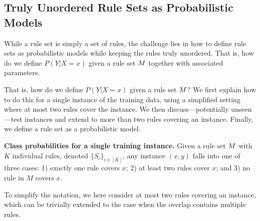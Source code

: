 \subsection{Truly Unordered Rule Sets as Probabilistic Models} \label{subsec:probRuleSet}

While a rule set is simply a set of rules, the challenge lies in how to define rule sets as probabilistic models while keeping the rules truly unordered. That is, how do we define $P(Y|X=x)$ given a rule set $M$ together with associated parameters. 

That is, how do we define $P(Y|X=x)$ given a rule set $M$? We first explain how to do this for a single instance of the training data, using a simplified setting where at most two rules cover the instance. We then discuss---potentially unseen---test instances and extend to more than two rules covering an instance. Finally, we define a rule set as a probabilistic model.


\medskip \noindent
\textbf{Class probabilities for a single training instance.} 
Given a rule set $M$ with $K$ individual rules, denoted $\{S_i\}_{i \in [K]}$, any instance $(x,y)$ falls into one of three cases: 1) exactly one rule covers $x$; 2) at least two rules cover $x$; and 3) no rule in $M$ covers $x$.

To simplify the notation, we here consider at most two rules covering an instance, which can be trivially extended to the case when the overlap contains multiple rules.

